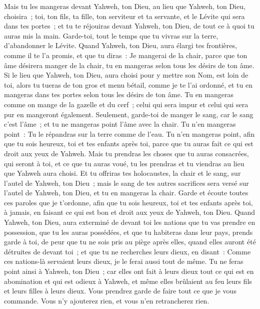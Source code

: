 \begin{multicols}{2}
Mais tu les mangeras devant Yahweh, ton Dieu, au lieu que Yahweh, ton Dieu, choisira~; toi, ton fils, ta fille, ton serviteur et ta servante, et le Lévite qui sera dans tes portes~; et tu te réjouiras devant Yahweh, ton Dieu, de tout ce à quoi tu auras mis la main.
Garde-toi, tout le temps que tu vivras sur la terre, d'abandonner le Lévite.
Quand Yahweh, ton Dieu, aura élargi tes frontières, comme il te l'a promis, et que tu diras~: Je mangerai de la chair, parce que ton âme désirera manger de la chair, tu en mangeras selon tous les désirs de ton âme.
Si le lieu que Yahweh, ton Dieu, aura choisi pour y mettre son Nom, est loin de toi, alors tu tueras de ton gros et menu bétail, comme je te l'ai ordonné, et tu en mangeras dans tes portes selon tous les désirs de ton âme.
Tu en mangeras comme on mange de la gazelle et du cerf~; celui qui sera impur et celui qui sera pur en mangeront également.
Seulement, garde-toi de manger le sang, car le sang c'est l'âme~; et tu ne mangeras point l'âme avec la chair.
Tu n'en mangeras point~: Tu le répandras sur la terre comme de l'eau.
Tu n'en mangeras point, afin que tu sois heureux, toi et tes enfants après toi, parce que tu auras fait ce qui est droit aux yeux de Yahweh.
Mais tu prendras les choses que tu auras consacrées, qui seront à toi, et ce que tu auras voué, tu les prendras et tu viendras au lieu que Yahweh aura choisi.
Et tu offriras tes holocaustes, la chair et le sang, sur l'autel de Yahweh, ton Dieu~; mais le sang de tes autres sacrifices sera versé sur l'autel de Yahweh, ton Dieu, et tu en mangeras la chair.
Garde et écoute toutes ces paroles que je t'ordonne, afin que tu sois heureux, toi et tes enfants après toi, à jamais, en faisant ce qui est bon et droit aux yeux de Yahweh, ton Dieu.
Quand Yahweh, ton Dieu, aura exterminé de devant toi les nations que tu vas prendre en possession, que tu les auras possédées, et que tu habiteras dans leur pays,
 prends garde à toi, de peur que tu ne sois pris au piège après elles, quand elles auront été détruites de devant toi~; et que tu ne recherches leurs dieux, en disant~: Comme ces nations-là servaient leurs dieux, je le ferai aussi tout de même.
Tu ne feras point ainsi à Yahweh, ton Dieu~; car elles ont fait à leurs dieux tout ce qui est en abomination et qui est odieux à Yahweh, et même elles brûlaient au feu leurs fils et leurs filles à leurs dieux.
Vous prendrez garde de faire tout ce que je vous commande. Vous n'y ajouterez rien, et vous n'en retrancherez rien.

\end{multicols}
